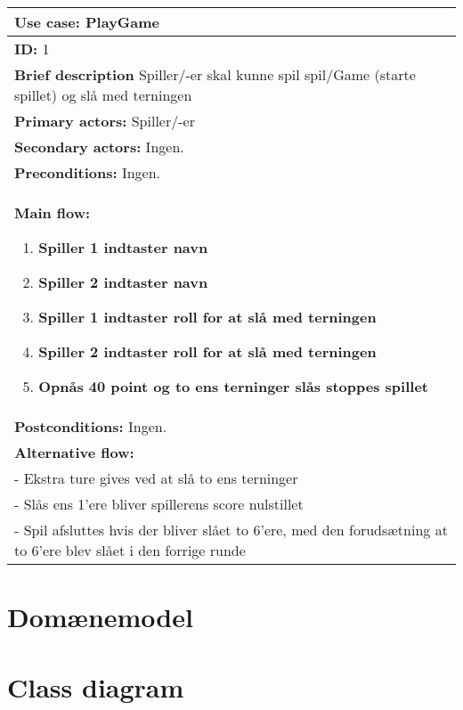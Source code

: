 \begin{center}
    \begin{tabular}{ | p{15cm} |}
    \hline
    \textbf{Use case:} PlayGame \\ \hline
    \textbf{ID:} 1 \\ \hline
    \textbf{Brief description} Spiller/-er skal kunne spil spil/Game (starte spillet) og slå med terningen     \\ \hline
    \textbf{Primary actors:} Spiller/-er \\ \hline
    \textbf{Secondary actors:} Ingen. \\ \hline
    \textbf{Preconditions:} Ingen.     \\ \hline
    \textbf{Main flow:}
    \begin{enumerate}
        \item \textbf{Spiller 1 indtaster navn}
        \item \textbf{Spiller 2 indtaster navn}
        \item \textbf{Spiller 1 indtaster roll for at slå med terningen}
        \item \textbf{Spiller 2 indtaster roll for at slå med terningen}
        \item \textbf{Opnås 40 point og to ens terninger slås stoppes spillet}    
    \end{enumerate} \\ \hline
    \textbf{Postconditions:} Ingen.\\ \hline
    \textbf{Alternative flow:}
    \\- Ekstra ture gives ved at slå to ens terninger
    \\- Slås ens 1’ere bliver spillerens score nulstillet
    \\- Spil afsluttes hvis der bliver slået to 6’ere, med den forudsætning at to 6’ere blev slået i den forrige runde  \\ \hline
    \hline
    \end{tabular}
\end{center}

\section{Domænemodel}

\section{Class diagram}